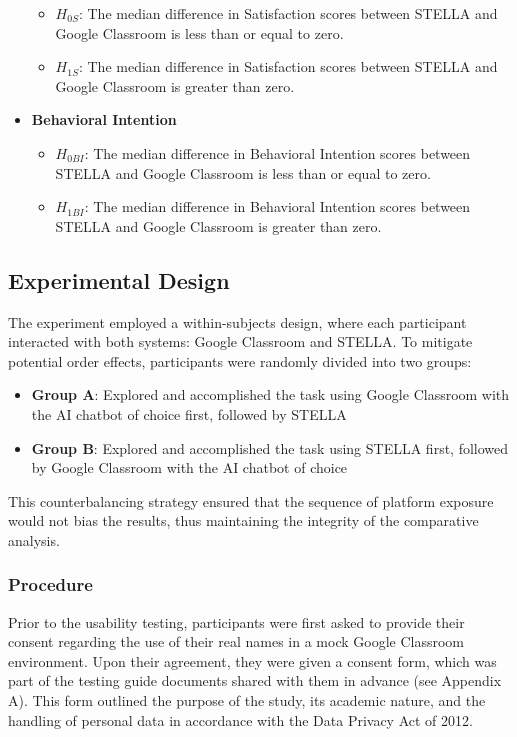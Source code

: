 \documentclass[sigconf,natbib=true]{acmart}
\begin{document}
\begin{itemize}
\begin{itemize}
    \item $H_{0S}$: The median difference in Satisfaction scores between STELLA and Google Classroom is less than or equal to zero.
    \item $H_{1S}$: The median difference in Satisfaction scores between STELLA and Google Classroom is greater than zero.
  \end{itemize}
\item \textbf{Behavioral Intention}
  \begin{itemize} 
    \item $H_{0BI}$: The median difference in Behavioral Intention scores between STELLA and Google Classroom is less than or equal to zero.
    \item $H_{1BI}$: The median difference in Behavioral Intention scores between STELLA and Google Classroom is greater than zero.
  \end{itemize}
\end{itemize}


\subsection{Experimental Design}
The experiment employed a within-subjects design, where each participant interacted with both systems: Google Classroom and STELLA\@. To mitigate potential order effects, participants were randomly divided into two groups:
\begin{itemize}
  \item \textbf{Group A}\@: Explored and accomplished the task using Google Classroom with the AI chatbot of choice first, followed by STELLA\@
  \item \textbf{Group B}\@: Explored and accomplished the task using STELLA first, followed by Google Classroom with the AI chatbot of choice
\end{itemize}

This counterbalancing strategy ensured that the sequence of platform exposure would not bias the results, thus maintaining the integrity of the comparative analysis.

\subsubsection{Procedure}
Prior to the usability testing, participants were first asked to provide their consent regarding the use of their real names in a mock Google Classroom environment. Upon their agreement, they were given a consent form, which was part of the testing guide documents shared with them in advance (see Appendix A). This form outlined the purpose of the study, its academic nature, and the handling of personal data in accordance with the Data Privacy Act of 2012.
\end{document}
